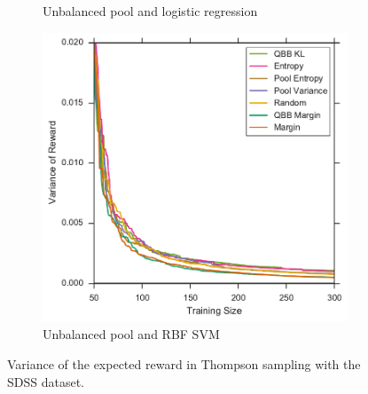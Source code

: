 \begin{figure}[p]
\begin{subfigure}{.5\textwidth}
		\caption{Unbalanced pool and logistic regression}
		\label{fig:sdss_ul_sigmas}
	\end{subfigure}%
	\begin{subfigure}{.5\textwidth}
		\centering
		\includegraphics[width=\linewidth]{figures/5_thompson/sdss_ur_sigmas}
		\caption{Unbalanced pool and RBF SVM}
		\label{fig:sdss_ur_sigmas}
	\end{subfigure}
	\caption[Variance of heuristics (SDSS)]{
		Variance of the expected reward in Thompson sampling with the SDSS dataset.}
	\label{fig:sdss_sigmas}
\end{figure}

